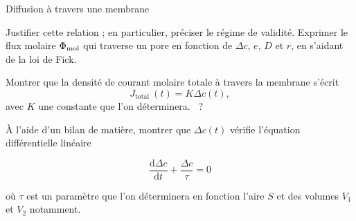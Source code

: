 \begin{exo}[PC][3][colle]{Diffusion à travers une membrane}
  \begin{quest}
    \item Justifier cette relation ; en particulier, préciser le régime de validité. Exprimer le flux molaire $\Phi_{\rm mol}$ qui traverse un pore en fonction de $\Delta c$, $e$, $D$ et $r$, en s'aidant de la loi de Fick.
\end{quest}
\begin{quest}
    \item Montrer que la densité de courant molaire totale à travers la membrane s'écrit
  \begin{equation}
    J_{\text {total }}(t)=K  \Delta c(t),
  \end{equation}
  avec $K$ une constante que l'on déterminera. \AN~?

    \item À l'aide d'un bilan de matière, montrer que $\Delta c(t)$ vérifie l'équation différentielle linéaire

  $$
  \frac{\mathrm{d} \Delta c}{\mathrm{d} t} +\frac{\Delta c}{\tau}=0
  $$

  où $\tau$ est un paramètre que l'on déterminera en fonction l'aire $S$ et des volumes $V_1$ et $V_2$ notamment.
\end{quest}
\end{exo}
